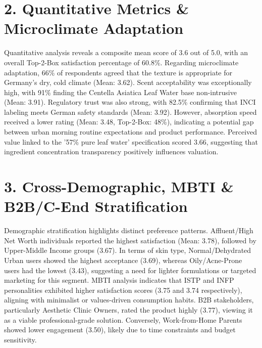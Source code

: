 \documentclass[10pt,twocolumn,a4paper]{article}
\begin{document}
\section{2. Quantitative Metrics \& Microclimate Adaptation}
Quantitative analysis reveals a composite mean score of 3.6 out of 5.0, with an overall Top-2-Box satisfaction percentage of 60.8\%. Regarding microclimate adaptation, 66\% of respondents agreed that the texture is appropriate for Germany's dry, cold climate (Mean: 3.62). Scent acceptability was exceptionally high, with 91\% finding the Centella Asiatica Leaf Water base non-intrusive (Mean: 3.91). Regulatory trust was also strong, with 82.5\% confirming that INCI labeling meets German safety standards (Mean: 3.92). However, absorption speed received a lower rating (Mean: 3.48, Top-2-Box: 48\%), indicating a potential gap between urban morning routine expectations and product performance. Perceived value linked to the '57\% pure leaf water' specification scored 3.66, suggesting that ingredient concentration transparency positively influences valuation.
\section{3. Cross-Demographic, MBTI \& B2B/C-End Stratification}
Demographic stratification highlights distinct preference patterns. Affluent/High Net Worth individuals reported the highest satisfaction (Mean: 3.78), followed by Upper-Middle Income groups (3.67). In terms of skin type, Normal/Dehydrated Urban users showed the highest acceptance (3.69), whereas Oily/Acne-Prone users had the lowest (3.43), suggesting a need for lighter formulations or targeted marketing for this segment. MBTI analysis indicates that ISTP and INFP personalities exhibited higher satisfaction scores (3.75 and 3.74 respectively), aligning with minimalist or values-driven consumption habits. B2B stakeholders, particularly Aesthetic Clinic Owners, rated the product highly (3.77), viewing it as a viable professional-grade solution. Conversely, Work-from-Home Parents showed lower engagement (3.50), likely due to time constraints and budget sensitivity.
\end{document}
